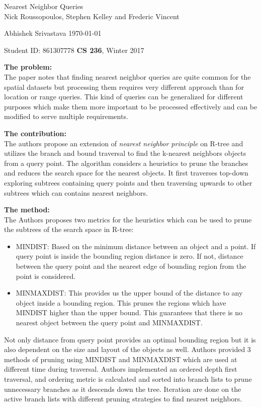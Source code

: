 \documentclass[a4paper,12pt, twoside]{article}
\renewcommand{\maketitle}{%
 	\Large
 	\begin{center}
 	Nearest Neighbor Queries \\	
 	\normalsize Nick Roussopoulos, Stephen Kelley and Frederic Vincent
 	\end{center}
 
 	\Large
	Abhishek Srivastava
	\hfill
	\normalsize
	\today
 	\par
 	Student ID: 861307778
 	\hfill
 	\textbf{CS 236}, Winter 2017
 	\par 	
 	\hrulefill
 	\par
 	}
\begin{document}
\thispagestyle{empty}
	
\maketitle

\textbf{The problem:}\\
The paper notes that finding nearest neighbor queries are quite common for the spatial datasets but processing them requires very different approach than for location or range queries. This kind of queries can be generalized for different purposes which make them more important to be processed effectively and can be modified to serve multiple requirements.   

\textbf{The contribution:}\\
The authors propose an extension of \emph{nearest neighbor principle} on R-tree and utilizes the branch and bound traversal to find the k-nearest neighbors objects from a query point. The algorithm considers a heuristics to prune the branches and reduces the search space for the nearest objects. It first traverses top-down exploring subtrees containing query points and then traversing upwards to other subtrees which can contains nearest neighbors. 

\textbf{The method:}\\
The Authors proposes two metrics for the heuristics which can be used to prune the subtrees of the search space in R-tree:
\begin{itemize}
	\item MINDIST: Based on the minimum distance between an object and a point. If query point is inside the bounding region distance is zero. If not, distance between the query point and the nearest edge of bounding region from the point is considered.
	\item MINMAXDIST: This provides us the upper bound of the distance to any object inside a bounding region. This prunes the regions which have MINDIST higher than the upper bound. This guarantees that there is no nearest object between the query point and MINMAXDIST.
\end{itemize}

Not only distance from query point provides an optimal bounding region but it is also dependent on the size and layout of the objects as well. Authors provided 3 methods of pruning using MINDIST and MINMAXDIST which are used at different time during traversal. Authors implemented an ordered depth first traversal, and ordering metric is calculated and sorted into branch lists to prune unnecessary branches as it descends down the tree. Iteration are done on the active branch lists with different pruning strategies to find nearest neighbors.
\end{document}
